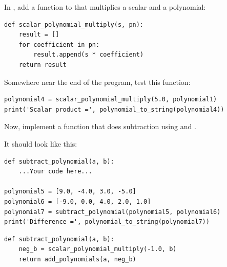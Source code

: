 In , add a function to that multiplies a scalar and a polynomial:
\begin{verbatim}
def scalar_polynomial_multiply(s, pn):
    result = []
    for coefficient in pn:
        result.append(s * coefficient)
    return result
\end{verbatim}

Somewhere near the end of the program, test this function:
\begin{verbatim}
polynomial4 = scalar_polynomial_multiply(5.0, polynomial1)
print('Scalar product =', polynomial_to_string(polynomial4))
\end{verbatim}

\begin{Exercise}[title=Subtract polynomials in Python, label=pysubpoly]
Now, implement a function that does subtraction using
 and
.

It should look like this:
\begin{verbatim}
def subtract_polynomial(a, b):
    ...Your code here...

polynomial5 = [9.0, -4.0, 3.0, -5.0]
polynomial6 = [-9.0, 0.0, 4.0, 2.0, 1.0]
polynomial7 = subtract_polynomial(polynomial5, polynomial6)
print('Difference =', polynomial_to_string(polynomial7))
\end{verbatim}
\end{Exercise}
\begin{Answer}[ref=pysubpoly]
\begin{verbatim}
def subtract_polynomial(a, b):
    neg_b = scalar_polynomial_multiply(-1.0, b)
    return add_polynomials(a, neg_b)
\end{verbatim}
\end{Answer}


    
